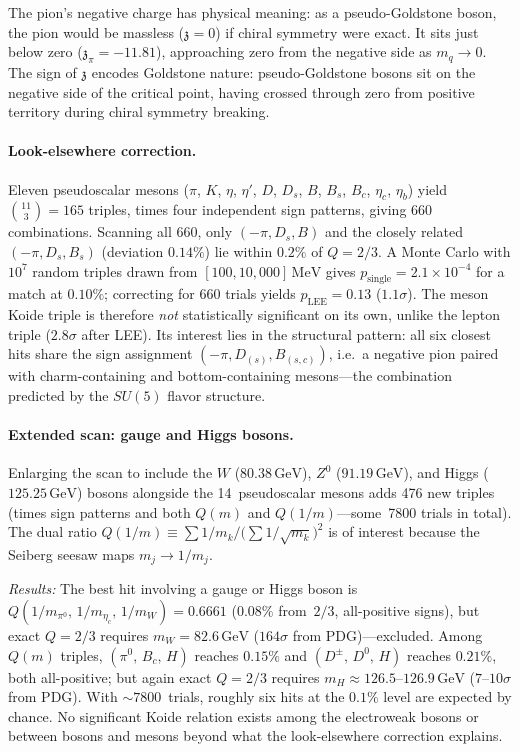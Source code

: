 \documentclass[12pt,a4paper]{article}
\newcommand{\MeV}{\,\text{MeV}}
\newcommand{\GeV}{\,\text{GeV}}
\newcommand{\zch}{\mathfrak{z}}
\begin{document}
The pion's negative charge has physical meaning: as a pseudo-Goldstone
boson, the pion would be massless ($\zch = 0$) if chiral symmetry were
exact. It sits just below zero ($\zch_\pi = -11.81$), approaching zero
from the negative side as $m_q \to 0$. The sign of $\zch$ encodes
Goldstone nature: pseudo-Goldstone bosons sit on the negative side
of the critical point, having crossed through zero from positive
territory during chiral symmetry breaking.

\paragraph{Look-elsewhere correction.}
Eleven pseudoscalar mesons ($\pi$, $K$, $\eta$, $\eta'$, $D$,
$D_s$, $B$, $B_s$, $B_c$, $\eta_c$, $\eta_b$) yield
$\binom{11}{3} = 165$ triples, times
four independent sign patterns, giving 660 combinations.
Scanning all 660, only $(-\pi, D_s, B)$ and the closely related
$(-\pi, D_s, B_s)$ (deviation $0.14\%$) lie within $0.2\%$ of
$Q = 2/3$. A Monte Carlo with $10^7$ random triples drawn
from $[100,10{,}000]\MeV$ gives $p_{\text{single}} = 2.1 \times 10^{-4}$
for a match at $0.10\%$; correcting for 660 trials yields
$p_{\text{LEE}} = 0.13$ ($1.1\sigma$). The meson Koide triple
is therefore \emph{not} statistically significant on its own,
unlike the lepton triple ($2.8\sigma$ after LEE). Its interest
lies in the structural pattern: all six closest hits share the
sign assignment $(-\pi, D_{(s)}, B_{(s,c)})$, i.e.\ a negative
pion paired with charm-containing and bottom-containing mesons---the
combination predicted by the $SU(5)$ flavor structure.

\paragraph{Extended scan: gauge and Higgs bosons.}
Enlarging the scan to include the $W$ ($80.38\GeV$), $Z^0$ ($91.19\GeV$),
and Higgs ($125.25\GeV$) bosons alongside the 14~pseudoscalar mesons
adds 476 new triples (times sign patterns and both $Q(m)$ and
$Q(1/m)$---some~7800 trials in total).  The dual ratio
$Q(1/m) \equiv \sum 1/m_k \bigl/ \bigl(\sum 1/\sqrt{m_k}\bigr)^2$
is of interest because the Seiberg seesaw maps $m_j \to 1/m_j$.

\emph{Results:}
The best hit involving a gauge or Higgs boson is
$Q(1/m_{\pi^0},\, 1/m_{\eta_c},\, 1/m_W) = 0.6661$ ($0.08\%$
from~$2/3$, all-positive signs), but exact $Q = 2/3$ requires
$m_W = 82.6\GeV$ ($164\sigma$ from PDG)---excluded.
Among $Q(m)$ triples, $(\pi^0,\, B_c,\, H)$ reaches $0.15\%$
and $(D^\pm,\, D^0,\, H)$ reaches $0.21\%$, both all-positive;
but again exact $Q = 2/3$ requires $m_H \approx 126.5$--$126.9\GeV$
($7$--$10\sigma$ from PDG).  With $\sim 7800$~trials, roughly six
hits at the $0.1\%$ level are expected by chance.
No significant Koide relation exists among the electroweak bosons
or between bosons and mesons beyond what the look-elsewhere
correction explains.
\end{document}
